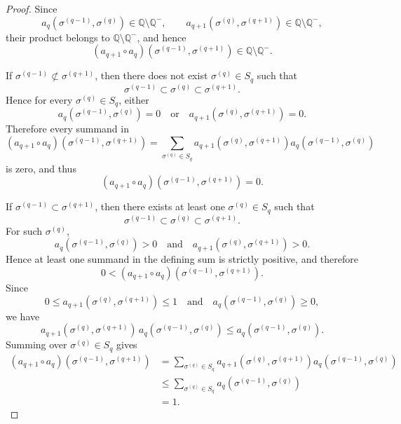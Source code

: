 \documentclass[10pt,a4paper]{amsart}
\begin{document}
\begin{proof}

Since
\[
a_q(\sigma^{(q-1)}, \sigma^{(q)}) 
\in \mathbb{Q} \setminus \mathbb{Q}^-,
\qquad
a_{q+1}(\sigma^{(q)}, \sigma^{(q+1)}) 
\in \mathbb{Q} \setminus \mathbb{Q}^-,
\]
their product belongs to $\mathbb{Q} \setminus \mathbb{Q}^-$, and hence
\[
(a_{q+1} \circ a_q)(\sigma^{(q-1)}, \sigma^{(q+1)})
\in \mathbb{Q} \setminus \mathbb{Q}^-.
\]

\medskip

\noindent
{}
If $\sigma^{(q-1)} \not\subset \sigma^{(q+1)}$, then there does not exist 
$\sigma^{(q)} \in S_q$ such that
\[
\sigma^{(q-1)} \subset \sigma^{(q)} 
\subset \sigma^{(q+1)}.
\]
Hence for every $\sigma^{(q)} \in S_q$, either
\[
a_q(\sigma^{(q-1)}, \sigma^{(q)}) = 0
\quad \text{or} \quad
a_{q+1}(\sigma^{(q)}, \sigma^{(q+1)}) = 0.
\]
Therefore every summand in
\[
(a_{q+1} \circ a_q)(\sigma^{(q-1)}, \sigma^{(q+1)})
=
\sum_{\sigma^{(q)} \in S_q}
a_{q+1}(\sigma^{(q)}, \sigma^{(q+1)})
a_q(\sigma^{(q-1)}, \sigma^{(q)})
\]
is zero, and thus
\[
(a_{q+1} \circ a_q)(\sigma^{(q-1)}, \sigma^{(q+1)}) = 0.
\]

\medskip

\noindent
{}
If $\sigma^{(q-1)} \subset \sigma^{(q+1)}$, then there exists at least one 
$\sigma^{(q)} \in S_q$ such that
\[
\sigma^{(q-1)} \subset \sigma^{(q)} 
\subset \sigma^{(q+1)}.
\]
For such $\sigma^{(q)}$,
\[
a_q(\sigma^{(q-1)}, \sigma^{(q)}) > 0
\quad \text{and} \quad
a_{q+1}(\sigma^{(q)}, \sigma^{(q+1)}) > 0.
\]
Hence at least one summand in the defining sum is strictly positive,
and therefore
\[
0 < (a_{q+1} \circ a_q)(\sigma^{(q-1)}, \sigma^{(q+1)}).
\]
Since 
\[
0 \le a_{q+1}(\sigma^{(q)}, \sigma^{(q+1)}) \le 1
\quad \text{and} \quad
a_q(\sigma^{(q-1)}, \sigma^{(q)}) \ge 0,
\]
we have
\[
a_{q+1}(\sigma^{(q)}, \sigma^{(q+1)})
\, a_q(\sigma^{(q-1)}, \sigma^{(q)})
\le
a_q(\sigma^{(q-1)}, \sigma^{(q)}).
\]
Summing over $\sigma^{(q)} \in S_q$ gives
\begin{align*}
(a_{q+1} \circ a_q)(\sigma^{(q-1)}, \sigma^{(q+1)})
&=
\sum_{\sigma^{(q)} \in S_q}
a_{q+1}(\sigma^{(q)}, \sigma^{(q+1)})
a_q(\sigma^{(q-1)}, \sigma^{(q)}) \\
&\le
\sum_{\sigma^{(q)} \in S_q}
a_q(\sigma^{(q-1)}, \sigma^{(q)}) \\
&= 1.
\end{align*}

\medskip


\end{proof}
\end{document}
